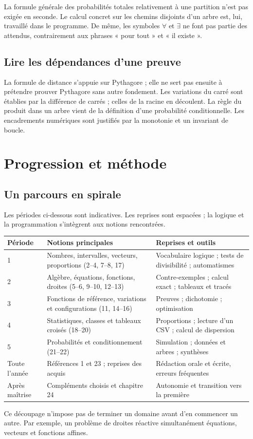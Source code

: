 \documentclass[11pt,a4paper,oneside]{book}
\begin{document}
La formule générale des probabilités totales relativement à une partition n'est pas exigée en seconde. Le calcul concret sur les chemins disjoints d'un arbre est, lui, travaillé dans le programme. De même, les symboles $\forall$ et $\exists$ ne font pas partie des attendus, contrairement aux phrases « pour tout » et « il existe ».
\section{Lire les dépendances d'une preuve}
La formule de distance s'appuie sur Pythagore ; elle ne sert pas ensuite à prétendre prouver Pythagore sans autre fondement. Les variations du carré sont établies par la différence de carrés ; celles de la racine en découlent. La règle du produit dans un arbre vient de la définition d'une probabilité conditionnelle. Les encadrements numériques sont justifiés par la monotonie et un invariant de boucle.
\chapter{Progression et méthode}
\section{Un parcours en spirale}
Les périodes ci-dessous sont indicatives. Les reprises sont espacées ; la logique et la programmation s'intègrent aux notions rencontrées.
\begin{center}\small\begin{tabularx}{\textwidth}{lXX}\toprule
Période & Notions principales & Reprises et outils\\\midrule
1 & Nombres, intervalles, vecteurs, proportions (2--4, 7--8, 17) & Vocabulaire logique ; tests de divisibilité ; automatismes\\
2 & Algèbre, équations, fonctions, droites (5--6, 9--10, 12--13) & Contre-exemples ; calcul exact ; tableaux et tracés\\
3 & Fonctions de référence, variations et configurations (11, 14--16) & Preuves ; dichotomie ; optimisation\\
4 & Statistiques, classes et tableaux croisés (18--20) & Proportions ; lecture d'un CSV ; calcul de dispersion\\
5 & Probabilités et conditionnement (21--22) & Simulation ; données et arbres ; synthèses\\
Toute l'année & Références 1 et 23 ; reprises des acquis & Rédaction orale et écrite, erreurs fréquentes\\
Après maîtrise & Compléments choisis et chapitre 24 & Autonomie et transition vers la première\\\bottomrule
\end{tabularx}\end{center}
Ce découpage n'impose pas de terminer un domaine avant d'en commencer un autre. Par exemple, un problème de droites réactive simultanément équations, vecteurs et fonctions affines.
\end{document}
